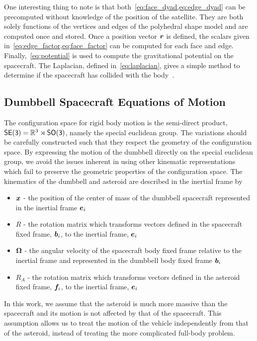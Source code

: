 \documentclass[letterpaper, paper,11pt]{AAS}		%
\begin{document}
One interesting thing to note is that both~\cref{eq:face_dyad,eq:edge_dyad} can be precomputed without knowledge of the position of the satellite.
They are both solely functions of the vertices and edges of the polyhedral shape model and are computed once and stored.
Once a position vector \( \bm{r} \) is defined, the scalars given in~\cref{eq:edge_factor,eq:face_factor} can be computed for each face and edge.
Finally,~\cref{eq:potential} is used to compute the gravitational potential on the spacecraft.
The Laplacian, defined in~\cref{eq:laplacian}, gives a simple method to determine if the spacecraft has collided with the body~\cite{werner1996}. 
\subsection{Dumbbell Spacecraft Equations of Motion}\label{sec:dumbbell}


The configuration space for rigid body motion is the semi-direct product, \(\mathsf{SE(3)} = \mathbb{R}^3 \rtimes \mathsf{SO(3)} \), namely the special euclidean group.
The variations should be carefully constructed such that they respect the geometry of the configuration space.
By expressing the motion of the dumbbell directly on the special euclidean group, we avoid the issues inherent in using other kinematic representations which fail to preserve the geometric properties of the configuration space.
The kinematics of the dumbbell and asteroid are described in the inertial frame by
\begin{itemize}
    \item \( \bm{x} \) - the position of the center of mass of the dumbbell spacecraft represented in the inertial frame \( \bm{e}_i\)
    \item \( R \) - the rotation matrix which transforms vectors defined in the spacecraft fixed frame, \( \bm{b}_i \), to the inertial frame, \( \bm{e}_i \)
    \item \( \bm{\Omega} \) - the angular velocity of the spacecraft body fixed frame relative to the inertial frame and represented in the dumbbell body fixed frame \( \bm{b}_i \)
    \item \( R_A \) - the rotation matrix which transforms vectors defined in the asteroid fixed frame, \( \bm{f}_i \), to the inertial frame, \( \bm{e}_i \)
\end{itemize}
In this work, we assume that the asteroid is much more massive than the spacecraft and its motion is not affected by that of the spacecraft.
This assumption allows us to treat the motion of the vehicle independently from that of the asteroid, instead of treating the more complicated full-body problem. 
\end{document}
